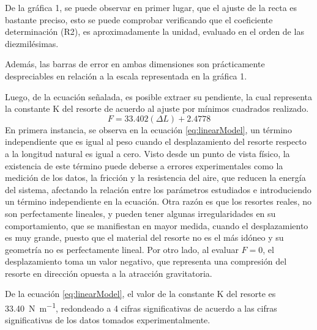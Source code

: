 \documentclass[../main.tex]{subfiles}
\begin{document}
De la gráfica 1, se puede observar en primer lugar, que el ajuste de la recta es bastante preciso, esto se puede comprobar verificando que el coeficiente determinación (R2), es aproximadamente la unidad, evaluado en el orden de las diezmilésimas.

Además, las barras de error en ambas dimensiones son prácticamente despreciables en relación a la escala representada en la gráfica 1.

Luego, de la ecuación señalada, es posible extraer su pendiente, la cual representa la constante K del resorte de acuerdo al ajuste por mínimos cuadrados realizado.
\begin{equation}
  F = \num{33.402} (\Delta L) + \num{2.4778}
  \label{eq:linearModel}
\end{equation}
En primera instancia, se observa en la ecuación \ref{eq:linearModel}, un término independiente que es igual al peso cuando el desplazamiento del resorte respecto a la longitud natural es igual a cero.
Visto desde un punto de vista físico, la existencia de este término puede deberse a errores experimentales como la medición de los datos, la fricción y la resistencia del aire, que reducen la energía del sistema, afectando la relación entre los parámetros estudiados e introduciendo un término independiente en la ecuación.
Otra razón es que los resortes reales, no son perfectamente lineales, y pueden tener algunas irregularidades en su comportamiento, que se manifiestan en mayor medida, cuando el desplazamiento es muy grande, puesto que el material del resorte no es el más idóneo y su geometría no es perfectamente lineal.
Por otro lado, al evaluar $F = 0$, el desplazamiento toma un valor negativo, que representa una compresión del resorte en dirección opuesta a la atracción gravitatoria.

De la ecuación \ref{eq:linearModel}, el valor de la constante K del resorte es \qty{33.40}{\newton\per\metre}, redondeado a 4 cifras significativas de acuerdo a las cifras significativas de los datos tomados experimentalmente.
\end{document}
